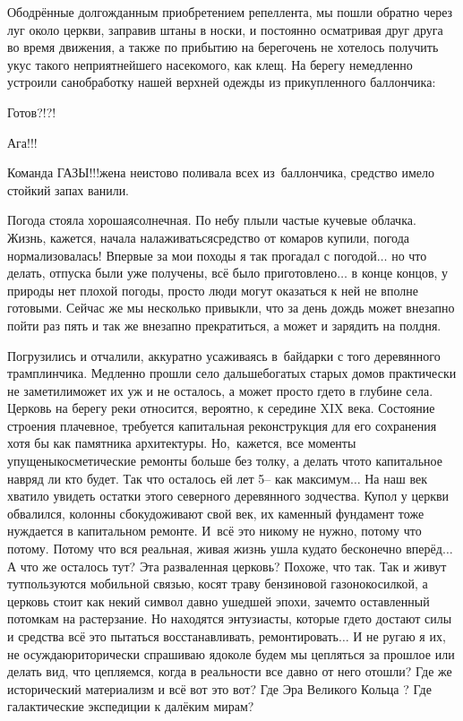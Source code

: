 Ободрённые долгожданным приобретением репеллента, мы пошли обратно через луг около церкви, заправив штаны в носки, и постоянно осматривая друг друга во время движения, а также по прибытию на берег\mdash очень не хотелось получить укус такого неприятнейшего насекомого, как клещ. На берегу немедленно устроили санобработку нашей верхней одежды из прикупленного баллончика:

\diagdash Готов?!?!

\diagdash Ага!!!

\diagdash Команда ГАЗЫ!!!\mdash жена неистово поливала всех из~баллончика, средство имело стойкий запах ванили.

Погода стояла хорошая\mdash солнечная. По небу плыли частые кучевые облачка. Жизнь, кажется, начала налаживаться\mdash средство от комаров купили, погода нормализовалась! Впервые за мои походы я так прогадал с погодой$\ldots$ но что делать, отпуска были уже получены, всё было приготовлено$\ldots$ в конце концов, у природы нет плохой погоды, просто люди могут оказаться к ней не вполне готовыми. Сейчас же мы несколько привыкли, что за день дождь может внезапно пойти раз пять и так же внезапно прекратиться, а может и зарядить на полдня. 

Погрузились и отчалили, аккуратно усаживаясь в~байдарки с того деревянного трамплинчика. Медленно прошли село дальше\mdash богатых старых домов практически не заметили\mdash может их уж и не осталось, а может просто где\sdash то в глубине села. Церковь на берегу реки относится, вероятно, к середине XIX века. Состояние строения плачевное, требуется капитальная реконструкция для его сохранения хотя бы как памятника архитектуры. Но,~кажется, все моменты упущены\mdash косметические ремонты больше без толку, а делать что\sdash то капитальное навряд ли кто будет. Так что осталось ей лет 5\thinspace\nobreakdash-- как максимум$\ldots$ На наш век хватило увидеть остатки этого северного деревянного зодчества. Купол у церкви обвалился, колонны сбоку\mdash доживают свой век, их каменный фундамент тоже нуждается в капитальном ремонте. И~всё это никому не нужно, потому что потому. Потому что вся реальная, живая жизнь ушла куда\sdash то бесконечно вперёд$\ldots$ А что же осталось тут? Эта разваленная церковь? Похоже, что так. Так и живут тут\mdash пользуются мобильной связью, косят траву бензиновой газонокосилкой, а церковь стоит как некий символ давно ушедшей эпохи, зачем\sdash то оставленный потомкам на растерзание. Но находятся энтузиасты, которые где\sdash то достают силы и средства всё это пытаться восстанавливать, ремонтировать$\ldots$ И не ругаю я их, не осуждаю\mdash риторически спрашиваю я\mdash доколе будем мы цепляться за прошлое или делать вид, что цепляемся, когда в реальности все давно от него отошли? Где же исторический материализм и всё вот это вот? Где Эра Великого Кольца \cite{ТуманностьАндромеды}? Где галактические экспедиции к далёким мирам?

